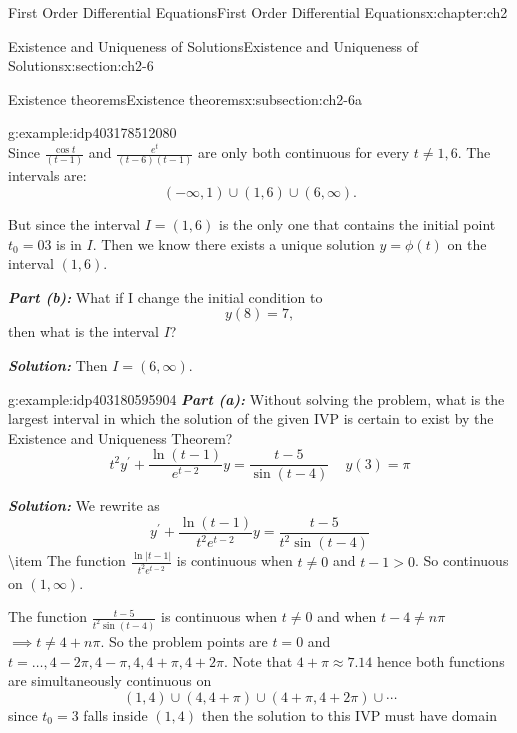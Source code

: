 \documentclass[oneside,10pt,]{book}
\newcommand{\alert}[1]{\textbf{\textit{#1}}}
\numberwithin{equation}{section}
\numberwithin{equation}{section}
\begin{document}
\begin{chapterptx}{First Order Differential Equations}{}{First Order Differential Equations}{}{}{x:chapter:ch2}
\begin{sectionptx}{Existence and Uniqueness of Solutions}{}{Existence and Uniqueness of Solutions}{}{}{x:section:ch2-6}
\begin{subsectionptx}{Existence theorems}{}{Existence theorems}{}{}{x:subsection:ch2-6a}
\begin{example}{}{g:example:idp403178512080}
\begin{equation*}
\end{equation*}
Since \(\frac{\cos t}{(t-1)}\) and \(\frac{e^{t}}{\left(t-6\right)(t-1)}\) are only both continuous for every \(t\neq1,6\). The intervals are:%
\begin{equation*}
\left(-\infty,1\right)\cup\left(1,6\right)\cup\left(6,\infty\right).
\end{equation*}
%
\par
But since the interval \(I=(1,6)\) is the only one that contains the initial point \(t_{0}=03\) is in \(I\). Then we know there exists a unique solution \(y=\phi(t)\) on the interval \((1,6)\).%
\par
\alert{Part (b):} What if I change the initial condition to%
\begin{equation*}
y(8)=7,
\end{equation*}
then what is the interval \(I\)?%
\par
\alert{Solution:} Then \(I=\left(6,\infty\right)\).%
\end{example}
\begin{example}{}{g:example:idp403180595904}%
\alert{Part (a):} Without solving the problem, what is the largest interval in which the solution of the given IVP is certain to exist by the Existence and Uniqueness Theorem?%
\begin{equation*}
t^{2}y^{\prime}+\frac{\ln\left(t-1\right)}{e^{t-2}}y=\frac{t-5}{\sin(t-4)}\,\,\,\,\,\,\,y(3)=\pi
\end{equation*}
%
\par
\alert{Solution:} We rewrite as%
\begin{equation*}
y^{\prime}+\frac{\ln\left(t-1\right)}{t^{2}e^{t-2}}y=\frac{t-5}{t^{2}\sin(t-4)}
\end{equation*}
\textbackslash{}item The function \(\frac{\ln\left|t-1\right|}{t^{2}e^{t-2}}\) is continuous when \(t\neq0\) and \(t-1>0\). So continuous on \((1,\infty)\).%
\par
The function \(\frac{t-5}{t^{2}\sin(t-4)}\) is continuous when \(t\neq0\) and when \(t-4\neq n\pi\) \(\implies t\neq4+n\pi\). So the problem points are \(t=0\) and \(t=\dots,4-2\pi,4-\pi,4,4+\pi,4+2\pi\). Note that \(4+\pi\approx7.14\) hence both functions are simultaneously continuous on%
\begin{equation*}
\left(1,4\right)\cup\left(4,4+\pi\right)\cup\left(4+\pi,4+2\pi\right)\cup\cdots
\end{equation*}
since \(t_{0}=3\) falls inside \((1,4)\) then the solution to this IVP must have domain%
\begin{equation*}

\end{equation*}
\end{example}
\end{subsectionptx}
\end{sectionptx}
\end{chapterptx}
\end{document}
